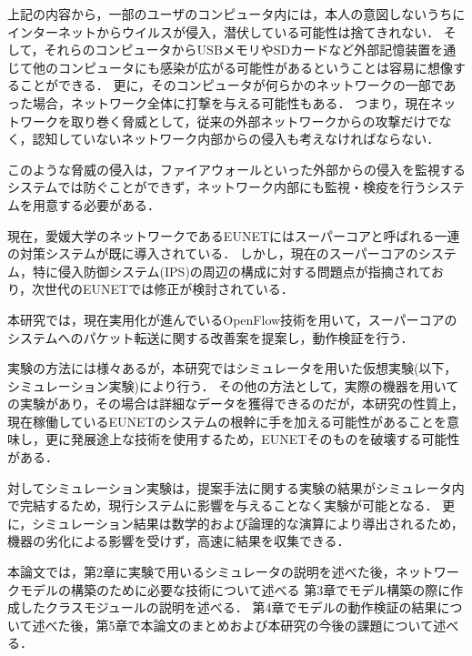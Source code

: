 上記の内容から，一部のユーザのコンピュータ内には，本人の意図しないうちにインターネットからウイルスが侵入，潜伏している可能性は捨てきれない．
そして，それらのコンピュータからUSBメモリやSDカードなど外部記憶装置を通じて他のコンピュータにも感染が広がる可能性があるということは容易に想像することができる．
更に，そのコンピュータが何らかのネットワークの一部であった場合，ネットワーク全体に打撃を与える可能性もある．
つまり，現在ネットワークを取り巻く脅威として，従来の外部ネットワークからの攻撃だけでなく，認知していないネットワーク内部からの侵入も考えなければならない．

このような脅威の侵入は，ファイアウォールといった外部からの侵入を監視するシステムでは防ぐことができず，ネットワーク内部にも監視・検疫を行うシステムを用意する必要がある．

現在，愛媛大学のネットワークであるEUNETにはスーパーコアと呼ばれる一連の対策システムが既に導入されている．
しかし，現在のスーパーコアのシステム，特に侵入防御システム(IPS)の周辺の構成に対する問題点が指摘されており，次世代のEUNETでは修正が検討されている．

本研究では，現在実用化が進んでいるOpenFlow技術を用いて，スーパーコアのシステムへのパケット転送に関する改善案を提案し，動作検証を行う．

実験の方法には様々あるが，本研究ではシミュレータを用いた仮想実験(以下，シミュレーション実験)により行う．
その他の方法として，実際の機器を用いての実験があり，その場合は詳細なデータを獲得できるのだが，本研究の性質上，現在稼働しているEUNETのシステムの根幹に手を加える可能性があることを意味し，更に発展途上な技術を使用するため，EUNETそのものを破壊する可能性がある．

対してシミュレーション実験は，提案手法に関する実験の結果がシミュレータ内で完結するため，現行システムに影響を与えることなく実験が可能となる．
更に，シミュレーション結果は数学的および論理的な演算により導出されるため，機器の劣化による影響を受けず，高速に結果を収集できる．

本論文では，第2章に実験で用いるシミュレータの説明を述べた後，ネットワークモデルの構築のために必要な技術について述べる
第3章でモデル構築の際に作成したクラスモジュールの説明を述べる．
第4章でモデルの動作検証の結果について述べた後，第5章で本論文のまとめおよび本研究の今後の課題について述べる．